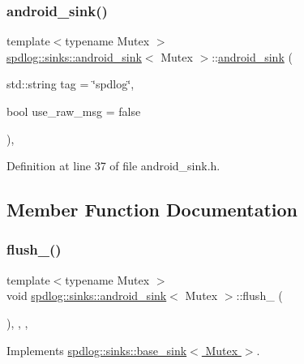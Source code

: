 \subsubsection{\texorpdfstring{android\+\_\+sink()}{android\_sink()}}
{\footnotesize\ttfamily template$<$typename Mutex $>$ \\
\hyperlink{classspdlog_1_1sinks_1_1android__sink}{spdlog\+::sinks\+::android\+\_\+sink}$<$ Mutex $>$\+::\hyperlink{classspdlog_1_1sinks_1_1android__sink}{android\+\_\+sink} (\begin{DoxyParamCaption}\item[{std\+::string}]{tag = {\ttfamily \char`\"{}spdlog\char`\"{}},  }\item[{bool}]{use\+\_\+raw\+\_\+msg = {\ttfamily false} }\end{DoxyParamCaption})\hspace{0.3cm}{\ttfamily [inline]}, {\ttfamily [explicit]}}



Definition at line 37 of file android\+\_\+sink.\+h.



\subsection{Member Function Documentation}
\mbox{\label{classspdlog_1_1sinks_1_1android__sink_ac71785899fb01c7b0328b66b3727e2c3}} 
\subsubsection{\texorpdfstring{flush\+\_\+()}{flush\_()}}
{\footnotesize\ttfamily template$<$typename Mutex $>$ \\
void \hyperlink{classspdlog_1_1sinks_1_1android__sink}{spdlog\+::sinks\+::android\+\_\+sink}$<$ Mutex $>$\+::flush\+\_\+ (\begin{DoxyParamCaption}{ }\end{DoxyParamCaption})\hspace{0.3cm}{\ttfamily [inline]}, {\ttfamily [override]}, {\ttfamily [protected]}, {\ttfamily [virtual]}}



Implements \hyperlink{classspdlog_1_1sinks_1_1base__sink_a5ac2b237c60f68a18122a1ca09b812b4}{spdlog\+::sinks\+::base\+\_\+sink$<$ Mutex $>$}.



